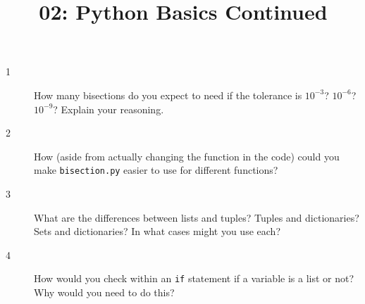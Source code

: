 \documentclass[10pt]{amsart}
\title{02: Python Basics Continued}
\begin{document}
\maketitle

\begin{description}
\item[1] How many bisections do you expect to need if the tolerance is
$10^{-3}$? $10^{-6}$? $10^{-9}$? Explain your reasoning.
\vspace{0.75in}

\item[2] How (aside from actually changing the function in the code) could you
make \verb+bisection.py+ easier to use for different functions?
\vspace{0.75in}

\item[3] What are the differences between lists and tuples? Tuples and
dictionaries? Sets and dictionaries? In what cases might you use each?
\vspace{0.75in}

\item[4] How would you check within an \verb+if+ statement if a variable is a
list or not? Why would you need to do this?
\vspace{0.75in}
\end{description}
\end{document}
